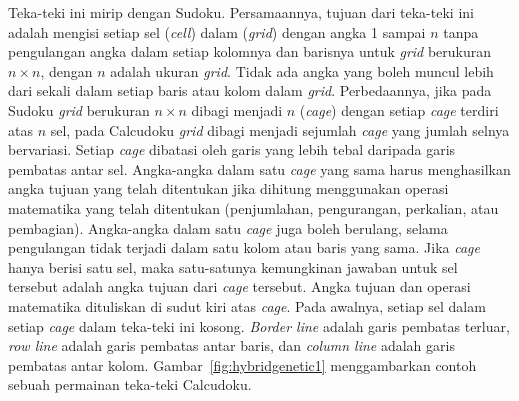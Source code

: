 Teka-teki ini mirip dengan Sudoku. Persamaannya, tujuan dari teka-teki ini adalah mengisi setiap sel (\textit{cell}) dalam (\textit{grid}) dengan angka 1 sampai \begin{math}n\end{math} tanpa pengulangan angka dalam setiap kolomnya dan barisnya untuk \textit{grid} berukuran \begin{math}n \times n\end{math}, dengan \begin{math}n\end{math} adalah ukuran \textit{grid}. Tidak ada angka yang boleh muncul lebih dari sekali dalam setiap baris atau kolom dalam \textit{grid}. Perbedaannya, jika pada Sudoku \textit{grid} berukuran \begin{math}n \times n\end{math} dibagi menjadi \begin{math}n\end{math} (\textit{cage}) dengan setiap \textit{cage} terdiri atas \begin{math}n\end{math} sel, pada Calcudoku \textit{grid} dibagi menjadi sejumlah \textit{cage} yang jumlah selnya bervariasi. Setiap \textit{cage} dibatasi oleh garis yang lebih tebal daripada garis pembatas antar sel. Angka-angka dalam satu \textit{cage} yang sama harus menghasilkan angka tujuan yang telah ditentukan jika dihitung menggunakan operasi matematika yang telah ditentukan (penjumlahan, pengurangan, perkalian, atau pembagian). Angka-angka dalam satu \textit{cage} juga boleh berulang, selama pengulangan tidak terjadi dalam satu kolom atau baris yang sama. Jika \textit{cage} hanya berisi satu sel, maka satu-satunya kemungkinan jawaban untuk sel tersebut adalah angka tujuan dari \textit{cage} tersebut. Angka tujuan dan operasi matematika dituliskan di sudut kiri atas \textit{cage}. Pada awalnya, setiap sel dalam setiap \textit{cage} dalam teka-teki ini kosong. \textit{Border line} adalah garis pembatas terluar, \textit{row line} adalah garis pembatas antar baris, dan \textit{column line} adalah garis pembatas antar kolom. Gambar~\ref{fig:hybridgenetic1} menggambarkan contoh sebuah permainan teka-teki Calcudoku. \cite{Fahda:2015, JohannaLukasSaputra:2012}

